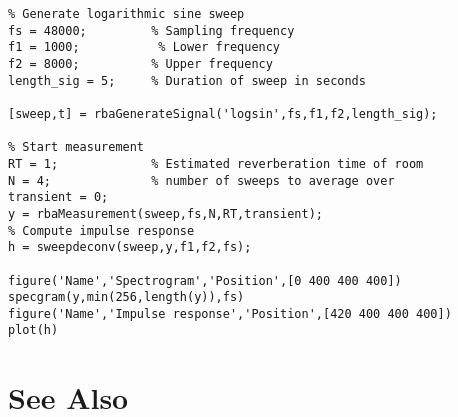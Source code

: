 \begin{lstlisting}
% Generate logarithmic sine sweep
fs = 48000;         % Sampling frequency
f1 = 1000;           % Lower frequency
f2 = 8000;          % Upper frequency
length_sig = 5;     % Duration of sweep in seconds

[sweep,t] = rbaGenerateSignal('logsin',fs,f1,f2,length_sig);

% Start measurement
RT = 1;             % Estimated reverberation time of room
N = 4;              % number of sweeps to average over
transient = 0;
y = rbaMeasurement(sweep,fs,N,RT,transient);
% Compute impulse response
h = sweepdeconv(sweep,y,f1,f2,fs);

figure('Name','Spectrogram','Position',[0 400 400 400])
specgram(y,min(256,length(y)),fs)
figure('Name','Impulse response','Position',[420 400 400 400])
plot(h)
\end{lstlisting}


\section{See Also} %
\label{sec:rbaMeasurement_see_also}

\texttt{}


